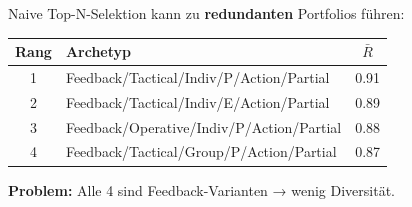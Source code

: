 \begin{tcolorbox}[colback=gray!5!white, colframe=gray!75!black,
    title=\textbf{Problem: Redundante Interventions-Portfolios}]

Naive Top-N-Selektion kann zu \textbf{redundanten} Portfolios führen:

\begin{center}
\begin{tabular}{@{}clc@{}}
\toprule
\textbf{Rang} & \textbf{Archetyp} & $\bar{R}$ \\
\midrule
1 & Feedback/Tactical/Indiv/P/Action/Partial & 0.91 \\
2 & Feedback/Tactical/Indiv/E/Action/Partial & 0.89 \\
3 & Feedback/Operative/Indiv/P/Action/Partial & 0.88 \\
4 & Feedback/Tactical/Group/P/Action/Partial & 0.87 \\
\bottomrule
\end{tabular}
\end{center}

\textbf{Problem:} Alle 4 sind Feedback-Varianten → wenig Diversität.

\end{tcolorbox}

